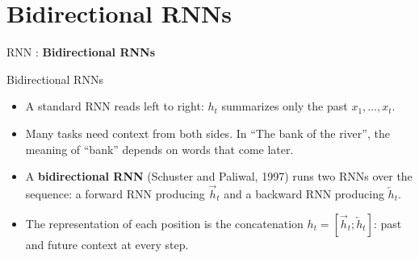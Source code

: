 \section{Bidirectional RNNs}
\begin{frame}{}
  \LARGE RNN : \textbf{Bidirectional RNNs}
\end{frame}

\begin{frame}{Bidirectional RNNs}
  \begin{itemize}
    \item A standard RNN reads left to right: $h_t$ summarizes only the past $x_1, \dots, x_t$.
    \item Many tasks need context from both sides. In ``The bank of the river'', the meaning of ``bank'' depends on words that come later.
    \item A \textbf{bidirectional RNN} (Schuster and Paliwal, 1997) runs two RNNs over the sequence: a forward RNN producing $\overrightarrow{h}_t$ and a backward RNN producing $\overleftarrow{h}_t$.
    \item The representation of each position is the concatenation $h_t = [\overrightarrow{h}_t; \overleftarrow{h}_t]$: past and future context at every step.
  \end{itemize}

  \vspace{0.5em}
  \centering
\end{frame}

